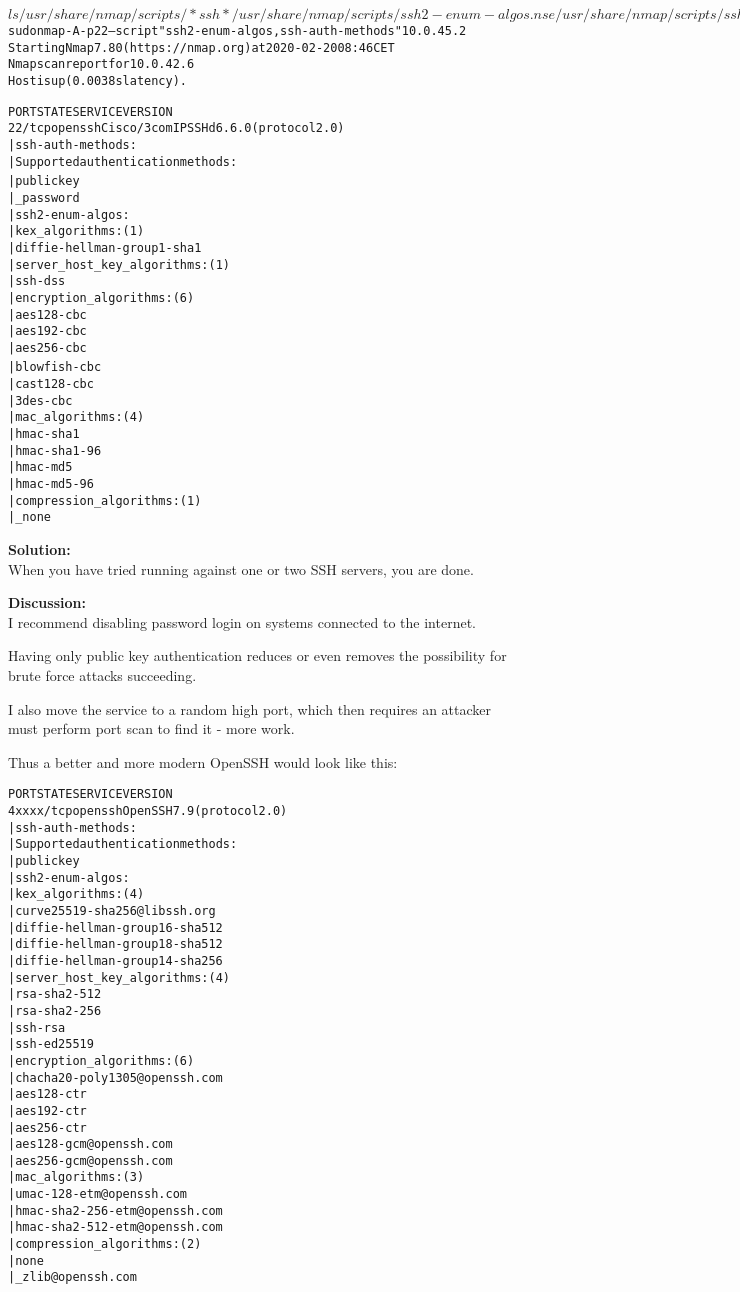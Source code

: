 \documentclass[a4paper,11pt,notitlepage]{report}
\begin{document}
\begin{alltt}\footnotesize
$ ls /usr/share/nmap/scripts/*ssh*
/usr/share/nmap/scripts/ssh2-enum-algos.nse   /usr/share/nmap/scripts/ssh-publickey-acceptance.nse
/usr/share/nmap/scripts/ssh-auth-methods.nse  /usr/share/nmap/scripts/ssh-run.nse
/usr/share/nmap/scripts/ssh-brute.nse	      /usr/share/nmap/scripts/sshv1.nse
/usr/share/nmap/scripts/ssh-hostkey.nse

$ sudo nmap -A -p 22 --script "ssh2-enum-algos,ssh-auth-methods" 10.0.45.2
Starting Nmap 7.80 ( https://nmap.org ) at 2020-02-20 08:46 CET
Nmap scan report for 10.0.42.6
Host is up (0.0038s latency).

PORT   STATE SERVICE VERSION
22/tcp open  ssh     Cisco/3com IPSSHd 6.6.0 (protocol 2.0)
| ssh-auth-methods:
|   Supported authentication methods:
|     publickey{\color{red}
|_    password}
| ssh2-enum-algos:
|   kex_algorithms: (1)
|       diffie-hellman-group1-sha1
|   server_host_key_algorithms: (1)
|       ssh-dss
|   encryption_algorithms: (6)
|       aes128-cbc
|       aes192-cbc
|       aes256-cbc
|       blowfish-cbc{\color{red}
|       cast128-cbc
|       3des-cbc}
|   mac_algorithms: (4)
|       hmac-sha1
|       hmac-sha1-96
|       hmac-md5
|       hmac-md5-96
|   compression_algorithms: (1)
|_      none
\end{alltt}

{\bf Solution:}\\
When you have tried running against one or two SSH servers, you are done.

{\bf Discussion:}\\
I recommend disabling password login on systems connected to the internet.

Having only public key authentication reduces or even removes the possibility for brute force attacks succeeding.

I also move the service to a random high port, which then requires an attacker must perform port scan to find it - more work.

Thus a better and more modern OpenSSH would look like this:
\begin{alltt}\footnotesize
PORT      STATE SERVICE VERSION
4xxxx/tcp open  ssh     OpenSSH 7.9 (protocol 2.0)
| ssh-auth-methods:
|   Supported authentication methods:
|     publickey
| ssh2-enum-algos:
|   kex_algorithms: (4)
|       curve25519-sha256@libssh.org
|       diffie-hellman-group16-sha512
|       diffie-hellman-group18-sha512
|       diffie-hellman-group14-sha256
|   server_host_key_algorithms: (4)
|       rsa-sha2-512
|       rsa-sha2-256
|       ssh-rsa
|       ssh-ed25519
|   encryption_algorithms: (6)
|       chacha20-poly1305@openssh.com
|       aes128-ctr
|       aes192-ctr
|       aes256-ctr
|       aes128-gcm@openssh.com
|       aes256-gcm@openssh.com
|   mac_algorithms: (3)
|       umac-128-etm@openssh.com
|       hmac-sha2-256-etm@openssh.com
|       hmac-sha2-512-etm@openssh.com
|   compression_algorithms: (2)
|       none
|_      zlib@openssh.com
\end{alltt}
\end{document}
